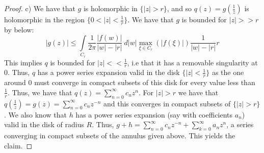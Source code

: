 \documentclass{article}
\begin{document}
\begin{proof}
  c) We have that $g$ is holomorphic in $\{|z| > r \}$, and so $q(z) = g(\frac{1}{z})$ is holomorphic in the region $\{0<|z| < \frac{1}{r}\}$. We have that $g$ is bounded for $|z| >> r$ by below:
  \[
    |g(z)| \leq \int\limits_{C_{r}} \frac{1}{2\pi}\frac{|f(w)|}{|w| - |r|} \ d|w| \max_{\xi \in C_{r}}(|f(\xi)|)\frac{1}{|w| - |r|} r
  \]
  This implies $q$ is bounded for $|z| << \frac{1}{r}$, i.e that it has a removable singularity at $0$. Thus, $q$ has a power series expansion valid in the disk $\{|z| < \frac{1}{r}\}$ as the one around $0$ must converge in compact subsets of this disk for every value less than $\frac{1}{r}$. Thus, we have that $q(z) = \sum_{n=0}^{\infty}c_{n}z^{n}$. For $|z| > r$ we have that $q(\frac{1}{z}) = g(z) = \sum_{n=0}^{\infty}c_{n}z^{-n}$ and this converges in compact subsets of $\{|z| > r\}$. We also know that $h$ has a power series expansion (say with coefficients $a_{n}$) valid in the disk of radius $R$. Thus, $g+h = \sum_{n=0}^{\infty}c_{n}z^{-n} + \sum_{k=0}^{\infty}a_{n}z^{n}$, a series converging in compact subsets of the annulus given above. This yields the claim. 
\end{proof}
\end{document}
